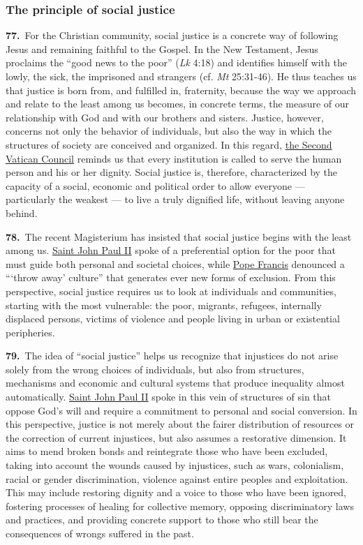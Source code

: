 \documentclass{article}
\begin{document}
\subsubsection{The principle of social justice}

\textbf{77.}\ For the Christian community, social justice is a concrete way of following Jesus and remaining faithful to the Gospel. In the New Testament, Jesus proclaims the ``good news to the poor'' (\emph{Lk} 4:18) and identifies himself with the lowly, the sick, the imprisoned and strangers (cf. \emph{Mt} 25:31-46). He thus teaches us that justice is born from, and fulfilled in, fraternity, because the way we approach and relate to the least among us becomes, in concrete terms, the measure of our relationship with God and with our brothers and sisters. Justice, however, concerns not only the behavior of individuals, but also the way in which the structures of society are conceived and organized. In this regard, \href{https://www.vatican.va/archive/hist_councils/ii_vatican_council/index.htm}{the Second Vatican Council} reminds us that every institution is called to serve the human person and his or her dignity.\cite{n105} Social justice is, therefore, characterized by the capacity of a social, economic and political order to allow everyone --- particularly the weakest --- to live a truly dignified life, without leaving anyone behind.

\textbf{78.}\ The recent Magisterium has insisted that social justice begins with the least among us. \href{https://www.vatican.va/content/john-paul-ii/en.html}{Saint John Paul II} spoke of a preferential option for the poor\cite{n106} that must guide both personal and societal choices, while \href{https://www.vatican.va/content/francesco/en.html}{Pope Francis} denounced a ```throw away' culture''\cite{n107} that generates ever new forms of exclusion. From this perspective, social justice requires us to look at individuals and communities, starting with the most vulnerable: the poor, migrants, refugees, internally displaced persons, victims of violence and people living in urban or existential peripheries.

\textbf{79.}\ The idea of ``social justice'' helps us recognize that injustices do not arise solely from the wrong choices of individuals, but also from structures, mechanisms and economic and cultural systems that produce inequality almost automatically. \href{https://www.vatican.va/content/john-paul-ii/en.html}{Saint John Paul II} spoke in this vein of structures of sin\cite{n108} that oppose God's will and require a commitment to personal and social conversion. In this perspective, justice is not merely about the fairer distribution of resources or the correction of current injustices, but also assumes a restorative dimension. It aims to mend broken bonds and reintegrate those who have been excluded, taking into account the wounds caused by injustices, such as wars, colonialism, racial or gender discrimination, violence against entire peoples and exploitation. This may include restoring dignity and a voice to those who have been ignored, fostering processes of healing for collective memory, opposing discriminatory laws and practices, and providing concrete support to those who still bear the consequences of wrongs suffered in the past.
\end{document}
